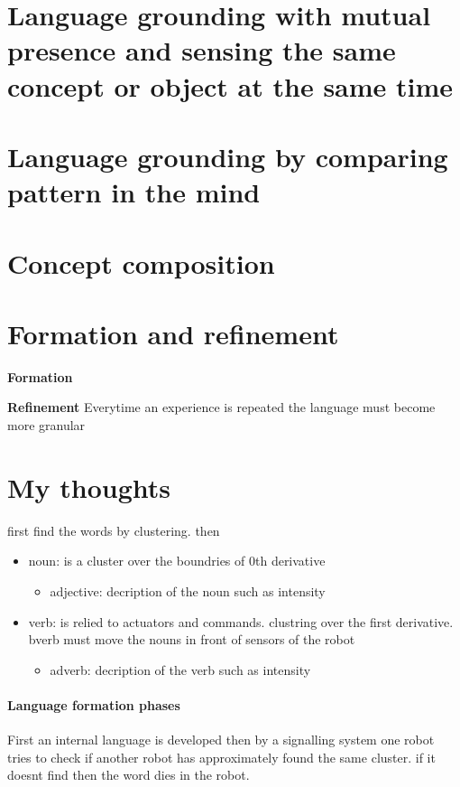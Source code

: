 \section{Language grounding with mutual presence and sensing the same concept or object at the same time}

\section{Language grounding by comparing pattern in the mind}

\section{Concept composition}

\section{Formation and refinement}
    \textbf{Formation}

    \textbf{Refinement} Everytime an experience is repeated the language must become more granular
    
\section{My thoughts}
first find the words by clustering. then
\begin{itemize}
    \item noun: is a cluster over the boundries of 0th derivative
        \begin{itemize}
            \item adjective: decription of the noun such as intensity
        \end{itemize}
    \item verb: is relied to actuators and commands. clustring over the first derivative. bverb must move the nouns in front of sensors of the robot
        \begin{itemize}
            \item adverb: decription of the verb such as intensity
        \end{itemize}
\end{itemize}

\paragraph{Language formation phases}
First an internal language is developed then by a signalling system one robot tries to check if another robot has approximately found the same cluster. if it doesnt find then the word dies in the robot.

